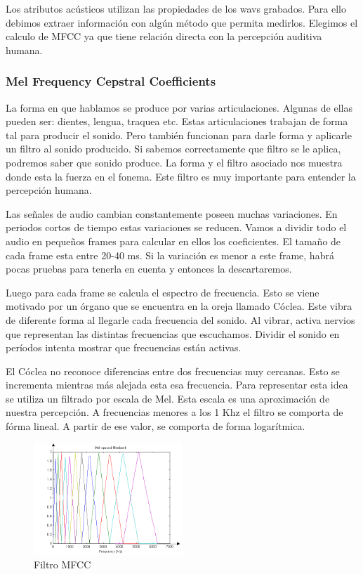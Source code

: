 \documentclass[11pt,a4paper,twoside]{tesis}
\begin{document}
Los atributos acústicos utilizan las propiedades de los wavs grabados. Para ello debimos extraer información con algún método que permita medirlos. Elegimos el calculo de MFCC ya que tiene relación directa con la percepción auditiva humana. 


\subsubsection{Mel Frequency Cepstral Coefficients}


La forma en que hablamos se produce por varias articulaciones. Algunas de ellas pueden ser: dientes, lengua, traquea etc. Estas articulaciones trabajan de forma tal para producir el sonido. Pero también funcionan para darle forma y aplicarle un filtro al sonido producido. Si sabemos correctamente que filtro se le aplica, podremos saber que sonido produce. La forma y el filtro asociado nos muestra donde esta la fuerza en el fonema. Este filtro es muy importante para entender la percepción humana.

Las señales de audio cambian constantemente poseen muchas variaciones. En periodos cortos de tiempo estas variaciones se reducen. Vamos a dividir todo el audio en pequeños frames para calcular en ellos los coeficientes. El tamaño de cada frame esta entre 20-40 ms. Si la variación es menor a este frame, habrá pocas pruebas para tenerla en cuenta y entonces la descartaremos.

Luego para cada frame se calcula el espectro de frecuencia. Esto se viene motivado por un órgano que se encuentra en la oreja llamado Cóclea. Este vibra de diferente forma al llegarle cada frecuencia del sonido. Al vibrar, activa nervios que representan las distintas frecuencias que escuchamos. Dividir el sonido en períodos intenta mostrar que frecuencias están activas.

El Cóclea no reconoce diferencias entre dos frecuencias muy cercanas. Esto se incrementa mientras más alejada esta esa frecuencia. Para representar esta idea se utiliza un filtrado por escala de Mel. Esta escala es una aproximación de nuestra percepción. A frecuencias menores a los 1 Khz el filtro se comporta de fórma lineal. A partir de ese valor, se comporta de forma logarítmica. 


\begin{figure}
    \centerline{\includegraphics[width=0.5\textwidth]{mfcc} }
    \caption{Filtro MFCC}
    \label{mfcc}
\end{figure}
\end{document}
